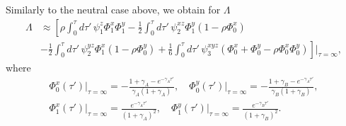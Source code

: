 \documentclass[11pt]{article}
\begin{document}
Similarly to the neutral case above, we obtain for $\Lambda$
\begin{align}\label{eq:num_lambda_unperturbed}
    \Lambda & \approx{} 
     \left[ \rho \int_0^{\tau} d\tau'\, \psi_1^z \Phi_1^x \Phi_1^y - \frac{1}{2} \int_0^{\tau} d\tau'\, \psi_2^{xz} \Phi_1^y \left(1-\rho \Phi_0^x\right) \right. \\ \nonumber
    & - \frac{1}{2} \left. \int_0^{\tau} d\tau'\, \psi_2^{yz} \Phi_1^x \left(1-\rho \Phi_0^y\right) + \frac{1}{6} \int_0^{\tau} d\tau'\,  \psi_3^{xyz} (\Phi_0^x + \Phi_0^y -\rho \Phi_0^x\Phi_0^y)
    \right]\Bigg\vert_{\tau=\infty},
\end{align}
where 
\begin{subequations}
    \begin{gather}
        \Phi_0^x(\tau') \Bigg\vert_{\tau=\infty} = -\frac{1+\gamma_A-e^{-\gamma_A\tau'}}{\gamma_A(1+\gamma_A)}, \quad \Phi_0^y(\tau') \Bigg\vert_{\tau=\infty} = -\frac{1+\gamma_B-e^{-\gamma_A\tau'}}{\gamma_B(1+\gamma_B)}, \\
        \Phi_1^x(\tau') \Bigg\vert_{\tau=\infty} = \frac{e^{-\gamma_A\tau'}}{(1+\gamma_A)^2}, \quad \Phi_1^y(\tau') \Bigg\vert_{\tau=\infty} = \frac{e^{-\gamma_B\tau'}}{(1+\gamma_B)^2}.
    \end{gather}
\end{subequations} \\
\end{document}
